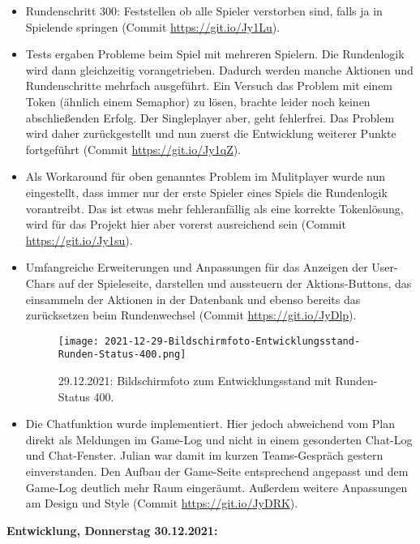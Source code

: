 \begin{itemize}
    \item Rundenschritt 300: Feststellen ob alle Spieler verstorben sind, falls ja in Spielende springen (Commit \url{https://git.io/Jy1Lu}).
    \item Tests ergaben Probleme beim Spiel mit mehreren Spielern. Die Rundenlogik wird dann gleichzeitig vorangetrieben. Dadurch werden manche Aktionen und Rundenschritte mehrfach ausgeführt. Ein Versuch das Problem mit einem Token (ähnlich einem Semaphor) zu lösen, brachte leider noch keinen abschließenden Erfolg. Der Singleplayer aber, geht fehlerfrei. Das Problem wird daher zurückgestellt und nun zuerst die Entwicklung weiterer Punkte fortgeführt (Commit \url{https://git.io/Jy1qZ}).
    \item Als Workaround für oben genanntes Problem im Mulitplayer wurde nun eingestellt, dass immer nur der erste Spieler eines Spiels die Rundenlogik vorantreibt. Das ist etwas mehr fehleranfällig als eine korrekte Tokenlösung, wird für das Projekt hier aber vorerst ausreichend sein (Commit \url{https://git.io/Jy1su}).
    \item Umfangreiche Erweiterungen und Anpassungen für das Anzeigen der User-Chars auf der Spieleseite, darstellen und aussteuern der Aktions-Buttons, das einsammeln der Aktionen in der Datenbank und ebenso bereits das zurücksetzen beim Rundenwechsel (Commit \url{https://git.io/JyDlp}).

    \begin{figure}[H]
        \centering
        \caption{29.12.2021: Bildschirmfoto zum Entwicklungsstand mit Runden-Status 400.}
        \label{fig:2021-12-29-Bildschirmfoto-Entwicklungsstand-Runden-Status-400.png}
        \texttt{[image: 2021-12-29-Bildschirmfoto-Entwicklungsstand-Runden-Status-400.png]}
    \end{figure}

    \item Die Chatfunktion wurde implementiert. Hier jedoch abweichend vom Plan direkt als Meldungen im Game-Log und nicht in einem gesonderten Chat-Log und Chat-Fenster. Julian war damit im kurzen Teams-Gespräch gestern einverstanden. Den Aufbau der Game-Seite entsprechend angepasst und dem Game-Log deutlich mehr Raum eingeräumt. Außerdem weitere Anpassungen am Design und Style (Commit \url{https://git.io/JyDRK}).

\end{itemize}


\textbf{Entwicklung, Donnerstag 30.12.2021:}

